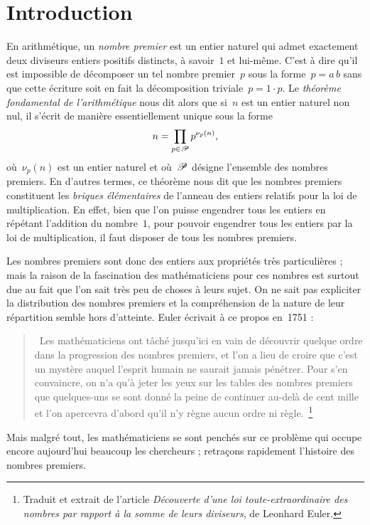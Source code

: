 		\chapter*{Introduction}
		En arithmétique, un \emph{nombre premier} est un entier naturel qui admet exactement deux diviseurs entiers positifs distincts, à savoir~$1$ et lui-même. C'est à dire qu'il est impossible de décomposer un tel nombre premier~$p$ sous la forme~$p=a\,b$ sans que cette écriture soit en fait la décomposition triviale~$p=1\cdot p$. Le \emph{théorème fondamental de l'arithmétique} nous dit alors que si~$n$ est un entier naturel non nul, il s'écrit de manière essentiellement unique sous la forme
		\[
			n = \prod_{p\in\mathscr{P}} p^{\nu_p(n)},
		\]
		où~$\nu_p(n)$ est un entier naturel et où~$\mathscr{P}$ désigne l'ensemble des nombres premiers. En d'autres termes, ce théorème nous dit que les nombres premiers constituent les \emph{briques élémentaires} de l'anneau des entiers relatifs pour la loi de multiplication. En effet, bien que l'on puisse engendrer tous les entiers en répétant l'addition du nombre~$1$, pour pouvoir engendrer tous les entiers par la loi de multiplication, il faut disposer de tous les nombres premiers.
		
		Les nombres premiers sont donc des entiers aux propriétés très particulières ; mais la raison de la fascination des mathématiciens pour ces nombres est surtout due au fait que l'on sait très peu de choses à leurs sujet. On ne sait pas expliciter la distribution des nombres premiers et la compréhension de la nature de leur répartition semble hors d'atteinte. Euler écrivait à ce propos en~1751 :
		\begin{quote}
			\og~Les mathématiciens ont tâché jusqu'ici en vain de découvrir quelque ordre dans la progression des nombres premiers, et l'on a lieu de croire que c'est un mystère auquel l'esprit humain ne saurait jamais pénétrer. Pour s'en convaincre, on n'a qu'à jeter les yeux sur les tables des nombres premiers que quelques-uns se sont donné la peine de continuer au-delà de cent mille et l'on apercevra d'abord qu'il n'y règne aucun ordre ni règle.~\fg\footnote{Traduit et extrait de l'article \textit{Découverte d'une loi toute-extraordinaire des nombres par rapport à la somme de leurs diviseurs}, de Leonhard Euler.}
		\end{quote}
		Mais malgré tout, les mathématiciens se sont penchés sur ce problème qui occupe encore aujourd'hui beaucoup les chercheurs ; retraçons rapidement l'histoire des nombres premiers.
		
